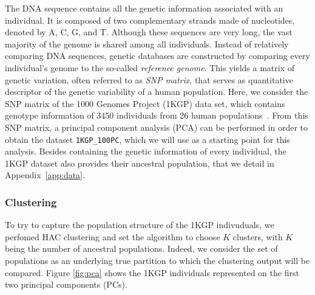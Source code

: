 \documentclass[a4paper,11pt]{article}
\theoremstyle{plain}
\newcommand{\1}{\mathbf{1}}
\begin{document}
The DNA sequence contains all the genetic information associated with an individual. It is composed of two complementary strands made of nucleotides, denoted by A, C, G, and T. Although these sequences are very long, the vast majority of the genome is shared among all individuals. Instead of relatively comparing DNA sequences, genetic databases are constructed by comparing every individual's genome to the so-called \textit{reference genome}. This yields a matrix of genetic variation, often referred to as \textit{SNP matrix}, that serves as quantitative descriptor of the genetic variability of a human population. Here, we consider the SNP matrix of the 1000 Genomes Project (1KGP) data set, which contains genotype information of 3450 individuals from 26 human populations~\cite{1kgp}. From this SNP matrix, a principal component analysis (PCA) can be performed in order to obtain the dataset \texttt{1KGP\_100PC}, which we will use as a starting point for this analysis. Besides containing the genetic information of every individual, the 1KGP dataset also provides their ancestral population, that we detail in Appendix~\ref{app:data}.

\subsubsection{Clustering}

To try to capture the population structure of the 1KGP indivuduals, we perfomed HAC clustering and set the algorithm to choose $K$ clusters, with $K$ being the number of ancestral populations. Indeed, we consider the set of populations as an underlying true partition to which the clustering output will be compared. Figure \ref{fig:pca} shows the 1KGP individuals represented on the first two principal components (PCs).
\end{document}
